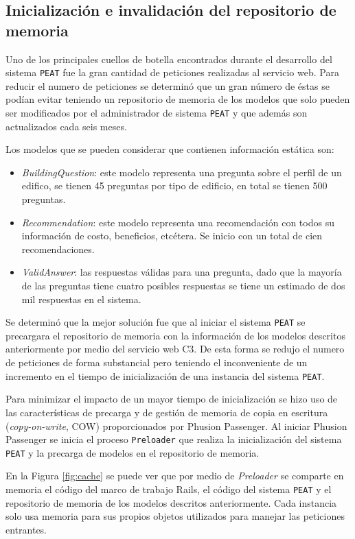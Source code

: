 \subsection{Inicialización e invalidación del repositorio de memoria}

Uno de los principales cuellos de botella encontrados durante el desarrollo
del sistema \texttt{PEAT} fue la gran cantidad de peticiones realizadas al
servicio web. Para reducir el numero de peticiones se determinó que un gran
número de éstas se podían evitar teniendo un repositorio de memoria de los modelos
que solo pueden ser modificados por el administrador de sistema \texttt{PEAT}
y que además son actualizados cada seis meses. 

Los modelos que se pueden considerar que contienen información estática son:
\begin{itemize}
\item \textit{BuildingQuestion}: este modelo representa una pregunta sobre
  el perfil de un edifico, se tienen 45 preguntas por tipo de edificio, en
  total se tienen 500 preguntas.
\item \textit{Recommendation}: este modelo representa una recomendación
  con todos su información de costo, beneficios, etcétera. Se inicio con un
  total de cien recomendaciones.
\item \textit{ValidAnswer}: las respuestas válidas para una pregunta, dado
  que la mayoría de las preguntas tiene cuatro posibles respuestas se tiene
  un estimado de dos mil respuestas en el sistema.
\end{itemize}

Se determinó que la mejor solución fue que al iniciar el sistema \texttt{PEAT}
se precargara el repositorio de memoria con la información de los modelos descritos
anteriormente por medio del servicio web C3. De esta forma se redujo el numero de
peticiones de forma substancial pero teniendo el inconveniente de un incremento
en el tiempo de inicialización de una instancia del sistema \texttt{PEAT}.

Para minimizar el impacto de un mayor tiempo de inicialización se hizo uso de las
características de precarga y de gestión de memoria de copia en escritura
(\textit{copy-on-write}, COW) proporcionados por Phusion Passenger. Al iniciar
Phusion Passenger se inicia el proceso \texttt{Preloader} que realiza la
inicialización del sistema \texttt{PEAT} y la precarga de modelos en el
repositorio de memoria.

En la Figura \ref{fig:cache} se puede ver que por medio de \textit{Preloader}
se comparte en memoria el código del marco de trabajo Rails, el código del sistema
\texttt{PEAT} y el repositorio de memoria de los modelos descritos anteriormente.
Cada instancia solo usa memoria para sus propios objetos utilizados para manejar las
peticiones entrantes.

